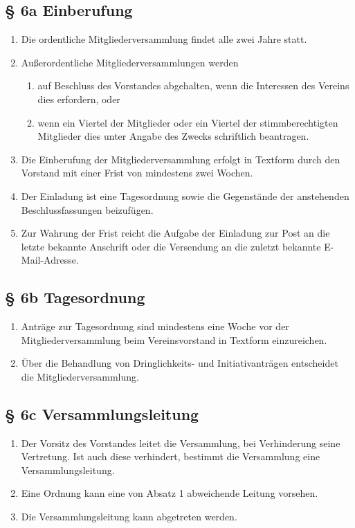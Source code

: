 \documentclass[11pt,a4paper]{scrartcl}
\begin{document}
\subsection*{§ 6a Einberufung}
\begin{enumerate}[label=\arabic*.]
    \item Die ordentliche Mitgliederversammlung findet alle zwei Jahre statt. 
    \item Außerordentliche Mitgliederversammlungen werden 
    \begin{enumerate}[label=\roman*.]
        \item auf Beschluss des Vorstandes abgehalten, wenn die Interessen des Vereins dies erfordern, oder 
        \item wenn ein Viertel der Mitglieder oder ein Viertel der stimmberechtigten Mitglieder dies unter Angabe des Zwecks schriftlich beantragen. 
    \end{enumerate}
    \item Die Einberufung der Mitgliederversammlung erfolgt in Textform durch den Vorstand mit einer Frist von mindestens zwei Wochen.
    \item Der Einladung ist eine Tagesordnung sowie die Gegenstände der anstehenden Beschlussfassungen beizufügen.
    \item Zur Wahrung der Frist reicht die Aufgabe der Einladung zur Post an die letzte bekannte Anschrift oder die Versendung an die zuletzt bekannte E-Mail-Adresse.
\end{enumerate}

\subsection*{§ 6b Tagesordnung}
\begin{enumerate}[label=\arabic*.]
    \item Anträge zur Tagesordnung sind mindestens eine Woche vor der Mitgliederversammlung beim Vereinsvorstand in Textform einzureichen.
    \item Über die Behandlung von Dringlichkeits- und Initiativanträgen entscheidet die Mitgliederversammlung.
\end{enumerate}

\subsection*{§ 6c Versammlungsleitung}
\begin{enumerate}[label=\arabic*.]
    \item Der Vorsitz des Vorstandes leitet die Versammlung, bei Verhinderung seine Vertretung. Ist auch diese verhindert, bestimmt die Versammlung eine Versammlungsleitung.
    \item Eine Ordnung kann eine von Absatz 1 abweichende Leitung vorsehen.
    \item Die Versammlungsleitung kann abgetreten werden.
\end{enumerate}
\end{document}
